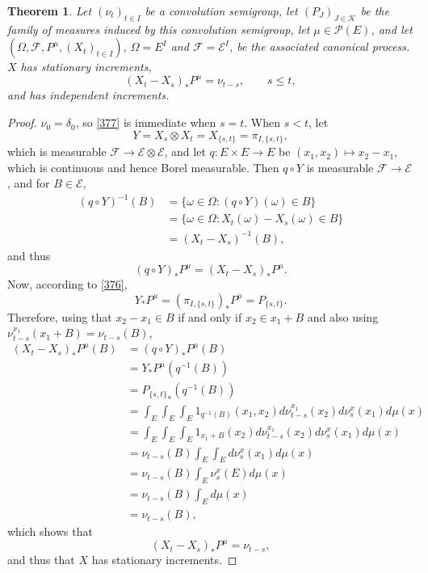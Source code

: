 \documentclass{article}
\newtheorem{theorem}{Theorem}
\theoremstyle{definition}
\begin{document}
\begin{theorem}
Let $(\nu_t)_{t \in I}$ be a convolution semigroup,
let $(P_J)_{J \in \mathscr{K}}$ be the family of measures induced by this convolution semigroup,
let $\mu \in \mathscr{P}(E)$, and let
$(\Omega,\mathscr{F},P^\mu,(X_t)_{t \in I})$,
$\Omega=E^I$ and $\mathscr{F}=\mathscr{E}^I$,
 be the associated canonical process. 
 $X$ has stationary increments,
 \begin{equation}
 (X_t-X_s)_*P^\mu = \nu_{t-s}, \qquad s \leq t,
 \label{377}
 \end{equation}
 and has independent increments.
 \label{increments}
\end{theorem}
\begin{proof}
$\nu_0=\delta_0$, so \eqref{377} is immediate when $s=t$. When $s<t$,
let 
\[
Y=X_s \otimes X_t=X_{\{s,t\}}=\pi_{I,\{s,t\}},
\]
which is measurable $\mathscr{F} \to \mathscr{E} \otimes \mathscr{E}$,
and let $q:E \times E \to E$ be
$(x_1,x_2) \mapsto x_2-x_1$, which is continuous and hence Borel measurable.
Then $q \circ Y$ is measurable $\mathscr{F} \to \mathscr{E}$, and for $B \in \mathscr{E}$, 
\begin{align*}
(q \circ Y)^{-1}(B) &= \{\omega \in \Omega: (q \circ Y)(\omega) \in  B\}\\
&=\{\omega \in \Omega: X_t(\omega)-X_s(\omega) \in B\}\\
&=(X_t-X_s)^{-1}(B),
\end{align*}
and thus
\begin{equation}
(q \circ Y)_*P^\mu = (X_t-X_s)_*P^\mu.
\label{qY}
\end{equation}
Now, according to \eqref{376},
\[
Y_*P^\mu = (\pi_{I,\{s,t\}})_*P^\mu = P_{\{s,t\}}.
\]
Therefore, using that $x_2-x_1 \in B$ if and only if $x_2 \in x_1+B$ and also using
$\nu_{t-s}^{x_1}(x_1+B)=\nu_{t-s}(B)$,
\begin{align*}
(X_t-X_s)_*P^\mu(B)&=(q \circ Y)_*P^\mu(B)\\
&=Y_*P^\mu(q^{-1}(B))\\
&={P_{\{s,t\}}}_*(q^{-1}(B))\\
&=\int_E \int_E \int_E 1_{q^{-1}(B)}(x_1,x_2) d\nu_{t-s}^{x_1}(x_2) d\nu_s^{x}(x_1) d\mu(x)\\
&=\int_E \int_E \int_E 1_{x_1+B}(x_2)  d\nu_{t-s}^{x_1}(x_2) d\nu_s^{x}(x_1) d\mu(x)\\
&=\nu_{t-s}(B) \int_E \int_E  d\nu_s^{x}(x_1) d\mu(x)\\
&=\nu_{t-s}(B) \int_E \nu_s^x(E) d\mu(x)\\
&=\nu_{t-s}(B) \int_E d\mu(x)\\
&=\nu_{t-s}(B),
\end{align*}
which shows that
\[
(X_t-X_s)_*P^\mu = \nu_{t-s},
\]
and thus that $X$ has stationary increments.


\end{proof}
\end{document}
